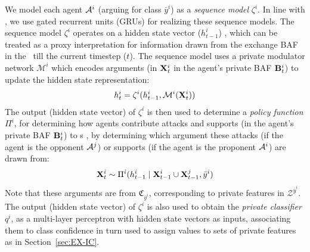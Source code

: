 We model each agent $\mathcal{ A}^{i}$ (arguing for class $\bar{y}^i$) as a \emph{sequence %
model} $\zeta^{i}$.
In line with \cite{kori2022explaining}, we use gated recurrent units (GRUs) for realizing these sequence models. %
%
The sequence model $\zeta^{i}$
operates on a hidden state vector ($h^i_{t-1}$)%
, which can be treated as a proxy interpretation for %
information %
drawn from the exchange BAF in the \FAXIC\ till the current timestep ($t$).
The sequence model uses a private modulator network $\mathcal{M}^i$
which encodes arguments (in $\mathbf{X}^{i}_{t}$ in the agent's private BAF $\mathbf{B}^{i}_t$) to update the hidden state representation:
\begin{align}
    h^i_{t} = \zeta^i(h^i_{t-1}, \mathcal{M}^i(\mathbf{X}^{i}_{t})) 
    \label{eqn:sequence_steps}
\end{align}
The output (hidden state vector) of $\zeta^i$  is then used to determine 
 a \emph{policy function} $\Pi^{i}$, for determining how agents contribute attacks and supports (in the agent's private BAF $\mathbf{B}^{i}_t$) to \FAXIC s%
, by determining which argument these attacks (if the agent is the opponent $\mathcal{ A}^j$) or supports (if the agent is the proponent $\mathcal{ A}^i$) are drawn from:
\begin{align}
    \ArgsI_{t} \sim \Pi^i(h^i_{t-1} \mid %
    \ArgsI_{t-1} \cup \Args^{j}_{t-1}, \bar{y}^i)  
 \end{align}
 Note that these arguments are from $\mathfrak{C}_{\bar{y}^i}$, corresponding to private features in $\mathcal{Z}^{\bar{y}^i}$.
%
The output (hidden state vector) of $\zeta^i$  is also used to obtain the \emph{private classifier} $q^{i}$, as a multi-layer perceptron with hidden state vectors as inputs,
associating them to class confidence in turn used to
assign values to sets of private features as in Section~\ref{sec:EX-IC}.








